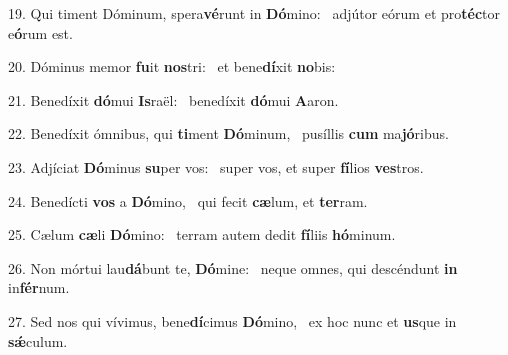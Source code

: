19. Qui timent Dóminum, spera\textbf{vé}runt in \textbf{Dó}mino: \ast\  adjútor eórum et pro\textbf{téc}tor e\textbf{ó}rum est.\

20. Dóminus memor \textbf{fu}it \textbf{nos}tri: \ast\  et bene\textbf{dí}xit \textbf{no}bis:\

21. Benedíxit \textbf{dó}mui \textbf{Is}raël: \ast\  benedíxit \textbf{dó}mui \textbf{A}aron.\

22. Benedíxit ómnibus, qui \textbf{ti}ment \textbf{Dó}minum, \ast\  pusíllis \textbf{cum} ma\textbf{jó}ribus.\

23. Adjíciat \textbf{Dó}minus \textbf{su}per vos: \ast\  super vos, et super \textbf{fí}lios \textbf{ves}tros.\

24. Benedícti \textbf{vos} a \textbf{Dó}mino, \ast\  qui fecit \textbf{cæ}lum, et \textbf{ter}ram.\

25. Cælum \textbf{cæ}li \textbf{Dó}mino: \ast\  terram autem dedit \textbf{fí}liis \textbf{hó}minum.\

26. Non mórtui lau\textbf{dá}bunt te, \textbf{Dó}mine: \ast\  neque omnes, qui descéndunt \textbf{in} in\textbf{fér}num.\

27. Sed nos qui vívimus, bene\textbf{dí}cimus \textbf{Dó}mino, \ast\  ex hoc nunc et \textbf{us}que in \textbf{sǽ}culum.\

